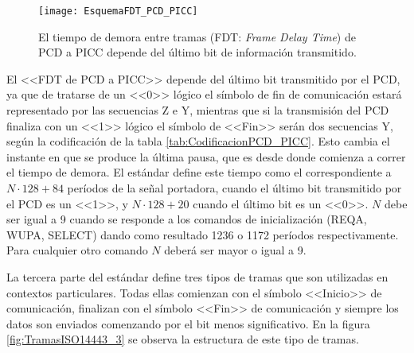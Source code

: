 \begin{figure}
	\centering
	\texttt{[image: EsquemaFDT\_PCD\_PICC]}
	
	\caption{El tiempo de demora entre tramas (FDT: \emph{Frame Delay Time}) 
	de PCD a PICC depende del último bit de información transmitido.}
	
	\label{fig:EsquemaFDT_PCD_PICC}
\end{figure}

El <<FDT de PCD a PICC>> depende del último bit transmitido por el PCD, ya 
que de tratarse de un <<0>> lógico el símbolo de fin de comunicación estará 
representado por las secuencias Z e Y, mientras que si la transmisión del 
PCD finaliza con un <<1>> lógico el símbolo de <<Fin>> serán dos secuencias 
Y, según la codificación de la tabla \ref{tab:CodificacionPCD_PICC}. Esto 
cambia el instante en que se produce la última pausa, que es desde donde 
comienza a correr el tiempo de demora. El estándar define este tiempo como 
el correspondiente a \(N \cdot 128 + 84\) períodos de la señal portadora, 
cuando el último bit transmitido por el PCD es un <<1>>, y \(N \cdot 128 + 20
\) cuando el último bit es un <<0>>. \(N\) debe ser igual a 9 cuando se 
responde a los comandos de inicialización (REQA, WUPA, SELECT) dando como 
resultado 1236 o 1172 períodos respectivamente. Para cualquier otro comando 
\(N\) deberá ser mayor o igual a 9.

\bigskip
La tercera parte del estándar define tres tipos de tramas que son utilizadas 
en contextos particulares. Todas ellas comienzan con el símbolo <<Inicio>> 
de comunicación, finalizan con el símbolo <<Fin>> de comunicación y siempre 
los datos son enviados comenzando por el bit menos significativo. En la 
figura \ref{fig:TramasISO14443_3} se observa la estructura de este tipo de 
tramas. 

